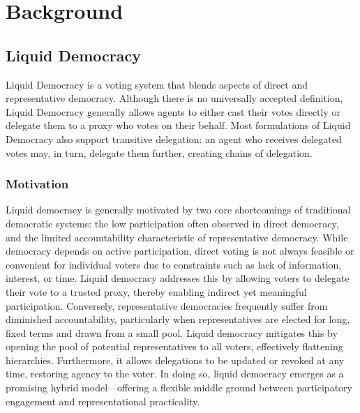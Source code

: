 \graphicspath{{../figures/}}

\chapter{Background}

\section{Liquid Democracy}

Liquid Democracy is a voting system that blends aspects of direct and representative democracy. Although there is no universally accepted definition, Liquid Democracy generally allows agents to either cast their votes directly or delegate them to a proxy who votes on their behalf. Most formulations of Liquid Democracy also support transitive delegation: an agent who receives delegated votes may, in turn, delegate them further, creating chains of delegation. \cite{degraveResolvingMultiproxyTransitive2014, boldiViscousDemocracySocial2011, revel2022liquid, bersetcheGeneralizingLiquidDemocracy2022}

\subsection{Motivation}

Liquid democracy is generally motivated by two core shortcomings of traditional democratic systems: the low participation often observed in direct democracy, and the limited accountability characteristic of representative democracy. \cite{fordDelegativeDemocracy2002, brillInteractiveDemocracy2018} While democracy depends on active participation, direct voting is not always feasible or convenient for individual voters due to constraints such as lack of information, interest, or time. Liquid democracy addresses this by allowing voters to delegate their vote to a trusted proxy, thereby enabling indirect yet meaningful participation. Conversely, representative democracies frequently suffer from diminished accountability, particularly when representatives are elected for long, fixed terms and drawn from a small pool. Liquid democracy mitigates this by opening the pool of potential representatives to all voters, effectively flattening hierarchies. Furthermore, it allows delegations to be updated or revoked at any time, restoring agency to the voter. \cite{brillInteractiveDemocracy2018} In doing so, liquid democracy emerges as a promising hybrid model—offering a flexible middle ground between participatory engagement and representational practicality.

